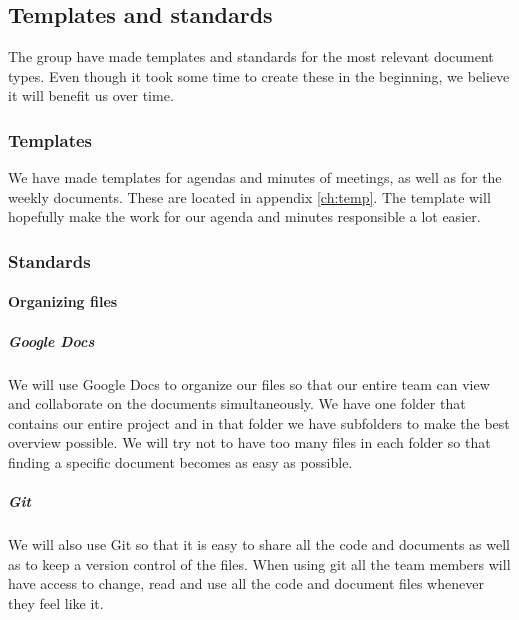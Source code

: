 \subsection{Templates and standards}
The group have made templates and standards for the most relevant document types. Even though it took some time to create these in the beginning, we believe it will benefit us over time.

\subsubsection{Templates}
We have made templates for agendas and minutes of meetings, as well as for the weekly documents. These are located in appendix \ref{ch:temp}. The template will hopefully make the work for our agenda and minutes responsible a lot easier.

\subsubsection{Standards}

\paragraph{Organizing files}
\subparagraph{Google Docs}\hfill
\newline
We will use Google Docs to organize our files so that our entire team can view and collaborate on the documents simultaneously. We have one folder that contains our entire project and in that folder we have subfolders to make the best overview possible. We will try not to have too many files in each folder so that finding a specific document becomes as easy as possible.

\subparagraph{Git}\hfill 
\newline
We will also use Git so that it is easy to share all the code and documents as well as to keep a version control of the files. When using \gls{git} all the team members will have access to change, read and use all the code and document files whenever they feel like it.

\newpage

